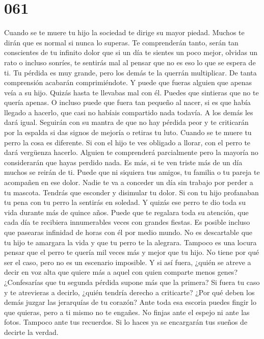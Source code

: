 \documentclass[a4paper,11pt,openright,twocolumn]{book}
\begin{document}
\section*{061}

Cuando se te muere tu hijo la sociedad te dirige su mayor piedad. Muchos te dirán que es normal si nunca lo superas. Te comprenderán tanto, serán tan conscientes de tu infinito dolor que si un día te sientes un poco mejor, olvidas un rato o incluso sonríes, te sentirás mal al pensar que no es eso lo que se espera de ti. Tu pérdida es muy grande, pero los demás te la querrán multiplicar. De tanta comprensión acabarán comprimiéndote. Y puede que fueras alguien que apenas veía a su hijo. Quizás hasta te llevabas mal con él. Puedes que sintieras que no te quería apenas. O incluso puede que fuera tan pequeño al nacer, si es que había llegado a hacerlo, que casi no habíais compartido nada todavía. A los demás les dará igual. Seguirán con su mantra de que no hay pérdida peor y te criticarán por la espalda si das signos de mejoría o retiras tu luto. Cuando se te muere tu perro la cosa es diferente. Si con el hijo te ves obligado a llorar, con el perro te dará vergüenza hacerlo. Alguien te comprenderá parcialmente pero la mayoría no considerarán que hayas perdido nada. Es más, si te ven triste más de un día muchos se reirán de ti. Puede que ni siquiera tus amigos, tu familia o tu pareja te acompañen en ese dolor. Nadie te va a conceder un día sin trabajo por perder a tu mascota. Tendrás que esconder y disimular tu dolor. Si con tu hijo profanaban tu pena con tu perro la sentirás en soledad. Y quizás ese perro te dio toda su vida durante más de quince años. Puede que te regalara toda su atención, que cada día te recibiera innumerables veces con grandes fiestas. Es posible incluso que pasearas infinidad de horas con él por medio mundo. No es descartable que tu hijo te amargara la vida y que tu perro te la alegrara. Tampoco es una locura pensar que el perro te quería mil veces más y mejor que tu hijo. No tiene por qué ser el caso, pero no es un escenario imposible. Y si así fuera, ¿quién se atreve a decir en voz alta que quiere más a aquel con quien comparte menos genes? ¿Confesarías que tu segunda pérdida supone más que la primera? Si fuera tu caso y te atrevieras a decirlo, ¿quién tendría derecho a criticarte? ¿Por qué deben los demás juzgar las jerarquías de tu corazón? Ante toda esa escoria puedes fingir lo que quieras, pero a ti mismo no te engañes. No finjas ante el espejo ni ante las fotos. Tampoco ante tus recuerdos. Si lo haces ya se encargarán tus sueños de decirte la verdad.
\end{document}
